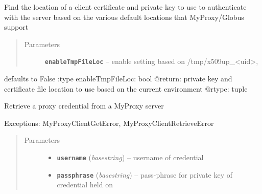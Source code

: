 \documentclass[letterpaper,10pt,english]{sphinxmanual}
\begin{document}
\begin{fulllineitems}
\begin{fulllineitems}
\end{fulllineitems}


\begin{fulllineitems}
\label{client:myproxy.client.MyProxyClient.locateClientCredentials}
Find the location of a client certificate and private key to use to 
authenticate with the server based on the various default locations
that MyProxy/Globus support
\begin{quote}\begin{description}
\item[{Parameters}] \leavevmode
\textbf{\texttt{enableTmpFileLoc}} -- enable setting based on /tmp/x509up\_\textless{}uid\textgreater{},

\end{description}\end{quote}

defaults to False
:type enableTmpFileLoc: bool
@return: private key and certificate file location to use based on the
current environment
@rtype: tuple

\end{fulllineitems}


\begin{fulllineitems}
\label{client:myproxy.client.MyProxyClient.logon}
Retrieve a proxy credential from a MyProxy server

Exceptions:  MyProxyClientGetError, MyProxyClientRetrieveError
\begin{quote}\begin{description}
\item[{Parameters}] \leavevmode\begin{itemize}
\item {} 
\textbf{\texttt{username}} (\emph{basestring}) -- username of credential

\item {} 
\textbf{\texttt{passphrase}} (\emph{basestring}) -- pass-phrase for private key of credential held on


\end{itemize}
\end{description}
\end{quote}
\end{fulllineitems}
\end{fulllineitems}
\end{document}
